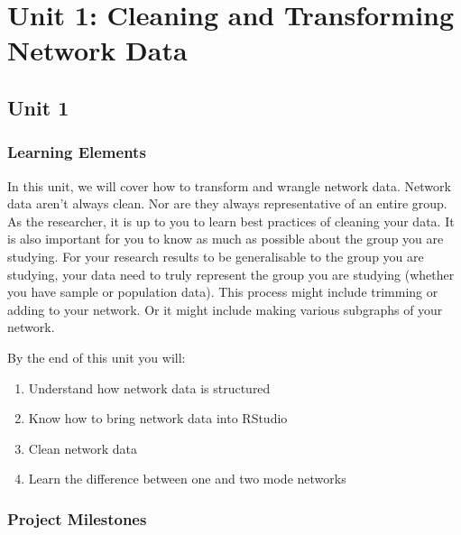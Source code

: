 \documentclass[
  letterpaper,
  DIV=11,
  numbers=noendperiod]{scrreprt}
\begin{document}
\part{Unit 1: Cleaning and Transforming Network Data}

\chapter{Unit 1}\label{unit-1}

\section{Learning Elements}\label{learning-elements}

In this unit, we will cover how to transform and wrangle network data.
Network data aren't always clean. Nor are they always representative of
an entire group. As the researcher, it is up to you to learn best
practices of cleaning your data. It is also important for you to know as
much as possible about the group you are studying. For your research
results to be generalisable to the group you are studying, your data
need to truly represent the group you are studying (whether you have
sample or population data). This process might include trimming or
adding to your network. Or it might include making various subgraphs of
your network.

By the end of this unit you will:

\begin{enumerate}
\def\labelenumi{\arabic{enumi}.}
\item
  Understand how network data is structured
\item
  Know how to bring network data into RStudio
\item
  Clean network data
\item
  Learn the difference between one and two mode networks
\end{enumerate}

\section{Project Milestones}\label{project-milestones}
\end{document}
